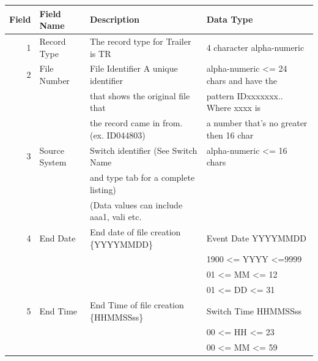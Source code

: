 \documentclass[12pt,twoside]{article}
\begin{document}
\begin{center}
\begin{tabular}{rlll}
\hline
 \textbf{Field}  &  \textbf{Field Name}  &  \textbf{Description}                      &  \textbf{Data Type}                       \\
\hline
              1  &  Record Type          &  The record type for Trailer is TR         &  4 character alpha-numeric                \\
              2  &  File Number          &  File Identifier A unique identifier       &  alpha-numeric <= 24 chars and have the   \\
                 &                       &  that shows the original file that         &  pattern IDxxxxxxx.. Where xxxx is        \\
                 &                       &  the record came in from. (ex. ID044803)   &  a number that's no greater then 16 char  \\
              3  &  Source System        &  Switch identifier  (See Switch Name       &  alpha-numeric <= 16 chars                \\
                 &                       &  and type tab for a complete listing)      &                                           \\
                 &                       &  (Data values can include aaa1, vali etc.  &                                           \\
              4  &  End Date             &  End date of file creation \{YYYYMMDD\}    &  Event Date YYYYMMDD                      \\
                 &                       &                                            &  1900 <= YYYY <=9999                      \\
                 &                       &                                            &  01 <= MM <= 12                           \\
                 &                       &                                            &  01 <= DD <= 31                           \\
              5  &  End Time             &  End Time of file creation \{HHMMSSss\}    &  Switch Time HHMMSSss                     \\
                 &                       &                                            &  00 <= HH <= 23                           \\
                 &                       &                                            &  00 <= MM <= 59                           \\

\end{tabular}
\end{center}
\end{document}
